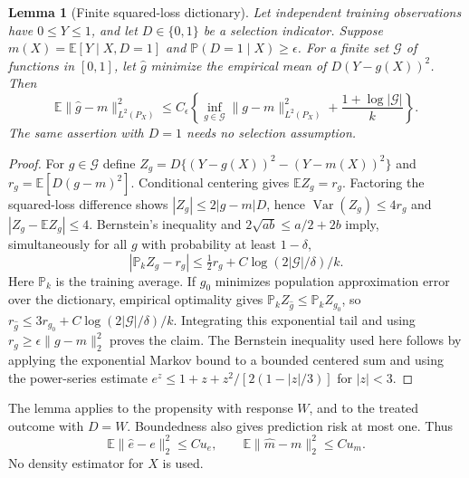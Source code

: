 \documentclass[11pt,a4paper]{article}
\newtheorem{lemma}[theorem]{Lemma}
\theoremstyle{definition}
\theoremstyle{remark}
\newcommand{\E}{\mathbb E}
\newcommand{\Prb}{\mathbb P}
\newcommand{\Var}{\operatorname{Var}}
\begin{document}
\begin{lemma}[Finite squared-loss dictionary]
Let independent training observations have $0\le Y\le1$, and let $D\in\{0,1\}$ be a selection indicator. Suppose $m(X)=\E[Y\mid X,D=1]$ and $\Prb(D=1\mid X)\ge\epsilon$. For a finite set $\mathcal G$ of functions in $[0,1]$, let $\hat g$ minimize the empirical mean of $D(Y-g(X))^2$. Then
\[
 \E\|\hat g-m\|_{L^2(P_X)}^2
 \le C_\epsilon\left\{\inf_{g\in\mathcal G}\|g-m\|_{L^2(P_X)}^2
              +\frac{1+\log|\mathcal G|}{k}\right\}.
\]
The same assertion with $D=1$ needs no selection assumption.
\end{lemma}
\begin{proof}
For $g\in\mathcal G$ define
$Z_g=D\{(Y-g(X))^2-(Y-m(X))^2\}$ and
$r_g=\E[D(g-m)^2]$. Conditional centering gives $\E Z_g=r_g$. Factoring the squared-loss difference shows $|Z_g|\le2|g-m|D$, hence $\Var(Z_g)\le4r_g$ and $|Z_g-\E Z_g|\le4$. Bernstein's inequality and $2\sqrt{ab}\le a/2+2b$ imply, simultaneously for all $g$ with probability at least $1-\delta$,
\[
 |\mathbb P_k Z_g-r_g|\le \tfrac12 r_g+
 C\log(2|\mathcal G|/\delta)/k.
\]
Here $\mathbb P_k$ is the training average. If $g_0$ minimizes population approximation error over the dictionary, empirical optimality gives
$\mathbb P_kZ_{\hat g}\le\mathbb P_kZ_{g_0}$, so
$r_{\hat g}\le3r_{g_0}+C\log(2|\mathcal G|/\delta)/k$.
Integrating this exponential tail and using
$r_g\ge\epsilon\|g-m\|_2^2$ proves the claim. The Bernstein inequality used here follows by applying the exponential Markov bound to a bounded centered sum and using the power-series estimate
$e^z\le1+z+z^2/[2(1-|z|/3)]$ for $|z|<3$.
\end{proof}

The lemma applies to the propensity with response $W$, and to the treated outcome with $D=W$. Boundedness also gives prediction risk at most one. Thus
\begin{equation}\label{eq:prediction}
 \E\|\hat e-e\|_2^2\le C u_e,
 \qquad \E\|\hat m-m\|_2^2\le C u_m.
\end{equation}
No density estimator for $X$ is used.
\end{document}
